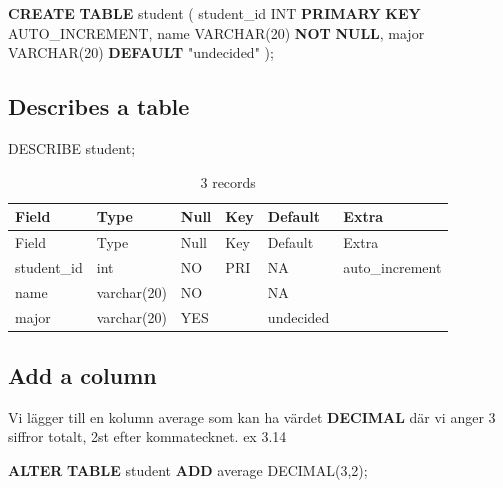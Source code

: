 \documentclass[
]{article}
\newenvironment{Shaded}{\begin{snugshade}}{\end{snugshade}}
\newcommand{\DataTypeTok}[1]{\textcolor[rgb]{0.13,0.29,0.53}{#1}}
\newcommand{\DecValTok}[1]{\textcolor[rgb]{0.00,0.00,0.81}{#1}}
\newcommand{\KeywordTok}[1]{\textcolor[rgb]{0.13,0.29,0.53}{\textbf{#1}}}
\newcommand{\NormalTok}[1]{#1}
\newcommand{\OtherTok}[1]{\textcolor[rgb]{0.56,0.35,0.01}{#1}}
\begin{document}
\begin{Shaded}
\begin{Highlighting}[]
\KeywordTok{CREATE} \KeywordTok{TABLE}\NormalTok{ student (}
\NormalTok{    student\_id }\DataTypeTok{INT} \KeywordTok{PRIMARY} \KeywordTok{KEY}\NormalTok{ AUTO\_INCREMENT,}
\NormalTok{    name }\DataTypeTok{VARCHAR}\NormalTok{(}\DecValTok{20}\NormalTok{) }\KeywordTok{NOT} \KeywordTok{NULL}\NormalTok{,}
\NormalTok{    major }\DataTypeTok{VARCHAR}\NormalTok{(}\DecValTok{20}\NormalTok{) }\KeywordTok{DEFAULT} \OtherTok{"undecided"}
\NormalTok{);}
\end{Highlighting}
\end{Shaded}

\subsection{Describes a table}\label{describes-a-table}

\begin{Shaded}
\begin{Highlighting}[]
\NormalTok{DESCRIBE student;}
\end{Highlighting}
\end{Shaded}

\begin{longtable}[]{@{}llllll@{}}
\caption{3 records}\tabularnewline
\toprule\noalign{}
Field & Type & Null & Key & Default & Extra \\
\midrule\noalign{}
\endfirsthead
\toprule\noalign{}
Field & Type & Null & Key & Default & Extra \\
\midrule\noalign{}
\endhead
\bottomrule\noalign{}
\endlastfoot
student\_id & int & NO & PRI & NA & auto\_increment \\
name & varchar(20) & NO & & NA & \\
major & varchar(20) & YES & & undecided & \\
\end{longtable}

\subsection{Add a column}\label{add-a-column}

Vi lägger till en kolumn average som kan ha värdet \textbf{DECIMAL} där
vi anger 3 siffror totalt, 2st efter kommatecknet. ex 3.14

\begin{Shaded}
\begin{Highlighting}[]
\KeywordTok{ALTER} \KeywordTok{TABLE}\NormalTok{ student }\KeywordTok{ADD}\NormalTok{ average }\DataTypeTok{DECIMAL}\NormalTok{(}\DecValTok{3}\NormalTok{,}\DecValTok{2}\NormalTok{);}
\end{Highlighting}
\end{Shaded}
\end{document}
